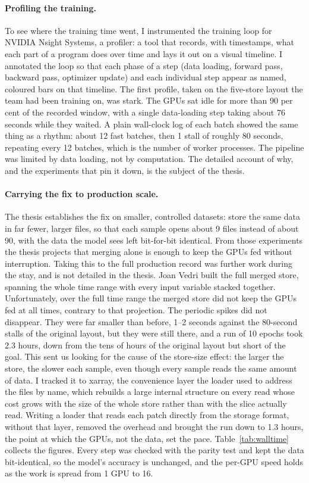 \documentclass[12pt,a4paper]{article}
\begin{document}
\paragraph{Profiling the training.} To see where the training time went, I instrumented the
training loop for NVIDIA Nsight Systems, a profiler: a tool that records, with timestamps, what each
part of a program does over time and lays it out on a visual timeline. I annotated the loop so that
each phase of a step (data loading, forward pass, backward pass, optimizer update) and each
individual step appear as named, coloured bars on that timeline. The first profile, taken on the
five-store layout the team had been training on, was stark. The GPUs sat idle for more than 90 per
cent of the recorded window, with a single data-loading step taking about 76 seconds while they
waited. A plain wall-clock log of each batch showed the same thing as a rhythm: about 12 fast
batches, then 1 stall of roughly 80 seconds, repeating every 12 batches, which is the number of
worker processes. The pipeline was limited by data loading, not by computation. The detailed account
of why, and the experiments that pin it down, is the subject of the thesis.

\paragraph{Carrying the fix to production scale.} The thesis establishes the fix on smaller,
controlled datasets: store the same data in far fewer, larger files, so that each sample opens about
9 files instead of about 90, with the data the model sees left bit-for-bit identical. From those
experiments the thesis projects that merging alone is enough to keep the GPUs fed without
interruption. Taking this to the full production record was further work during the stay, and is not
detailed in the thesis. Joan Vedri built the full merged store, spanning the whole time range with
every input variable stacked together. Unfortunately, over the full time range the merged store did
not keep the GPUs fed at all times, contrary to that projection. The periodic spikes did not
disappear. They were far smaller than before, 1--2 seconds against the 80-second stalls of the
original layout, but they were still there, and a run of 10 epochs took 2.3 hours, down from the
tens of hours of the original layout but short of the goal. This sent us looking for the cause of
the store-size effect: the larger the store, the slower each sample, even though every sample reads
the same amount of data. I tracked it to xarray, the convenience layer the loader used to address
the files by name, which rebuilds a large internal structure on every read whose cost grows with the
size of the whole store rather than with the slice actually read. Writing a loader that reads each
patch directly from the storage format, without that layer, removed the overhead and brought the run
down to 1.3 hours, the point at which the GPUs, not the data, set the pace.
Table~\ref{tab:walltime} collects the figures. Every step was checked with the parity test and kept
the data bit-identical, so the model's accuracy is unchanged, and the per-GPU speed holds as the
work is spread from 1 GPU to 16.
\end{document}
